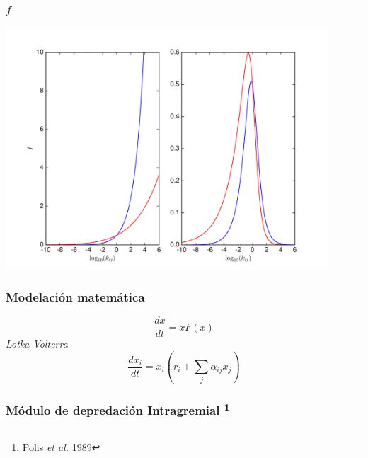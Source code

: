 \documentclass[11 pt,t]{beamer}
\begin{document}
\begin{frame}
  \frametitle{$f$}
  \centering
  \includegraphics[width=0.9\textwidth]{../manuscript/Plots/f1Grazing.pdf}
\end{frame}
\begin{frame}
  \frametitle{Modelaci\'on matem\'atica}
  \Large
  \begin{equation}
    \frac{dx}{dt} = xF(x)
  \end{equation}
  \Large \textit{Lotka Volterra}
  \begin{equation}
    \frac{dx_i}{dt} = x_i (r_i + \sum_j \alpha_{ij}x_j)
  \end{equation}
\end{frame}
\begin{frame}
  \frametitle{M\'odulo de depredaci\'on Intragremial \footnote{Polis \textit{et al.} 1989}}
  \centering
  
\end{frame}
\end{document}
